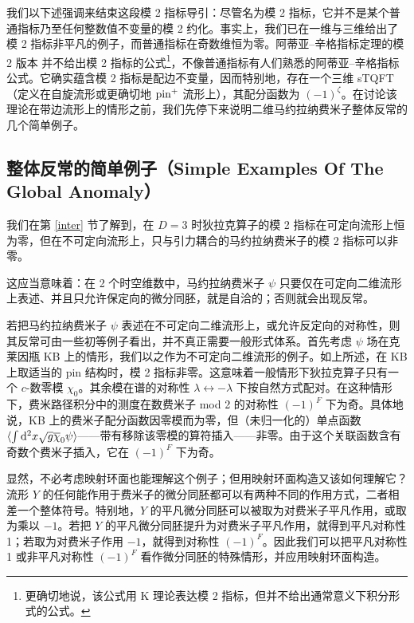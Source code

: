 我们以下述强调来结束这段模 2 指标导引：尽管名为模 2 指标，它并不是某个普通指标乃至任何整数值不变量的模 2 约化。事实上，我们已在一维与三维给出了模 2 指标非平凡的例子，而普通指标在奇数维恒为零。阿蒂亚--辛格指标定理的模 2 版本 \cite{AStwo} 并不给出模 2 指标的公式\footnote{更确切地说，该公式用 K 理论表达模 2 指标，但并不给出通常意义下积分形式的公式。}，不像普通指标有人们熟悉的阿蒂亚--辛格指标公式。它确实蕴含模 2 指标是配边不变量，因而特别地，存在一个三维 sTQFT（定义在自旋流形或更确切地 ${\mathrm{pin}}^+$ 流形上），其配分函数为 $(-1)^\zeta$。在讨论该理论在带边流形上的情形之前，我们先停下来说明二维马约拉纳费米子整体反常的几个简单例子。


\subsection{整体反常的简单例子（Simple Examples Of The Global Anomaly）}\label{simpex}

我们在第 \ref{inter} 节了解到，在 $D=3$ 时狄拉克算子的模 2 指标在可定向流形上恒为零，但在不可定向流形上，只与引力耦合的马约拉纳费米子的模 2 指标可以非零。

这应当意味着：在 2 个时空维数中，马约拉纳费米子 $\psi$ 只要仅在可定向二维流形上表述、并且只允许保定向的微分同胚，就是自洽的；否则就会出现反常。

若把马约拉纳费米子 $\psi$ 表述在不可定向二维流形上，或允许反定向的对称性，则其反常可由一些初等例子看出，并不真正需要一般形式体系。首先考虑 $\psi$ 场在克莱因瓶 KB 上的情形，我们以之作为不可定向二维流形的例子。如上所述，在 KB 上取适当的 pin 结构时，模 2 指标非零。这意味着一般情形下狄拉克算子只有一个 $c$-数零模 $\chi_0$。其余模在谱的对称性 $\lambda\leftrightarrow-\lambda$ 下按自然方式配对。在这种情形下，费米路径积分中的测度在数费米子 mod 2 的对称性 $(-1)^F$ 下为奇。具体地说，KB 上的费米子配分函数因零模而为零，但（未归一化的）单点函数 $\langle \int{\mathrm d}^2x\sqrt g\overline\chi_0\psi\rangle$------带有移除该零模的算符插入------非零。由于这个关联函数含有奇数个费米子插入，它在 $(-1)^F$ 下为奇。

显然，不必考虑映射环面也能理解这个例子；但用映射环面构造又该如何理解它？流形 $Y$ 的任何能作用于费米子的微分同胚都可以有两种不同的作用方式，二者相差一个整体符号。特别地，$Y$ 的平凡微分同胚可以被取为对费米子平凡作用，或取为乘以 $-1$。若把 $Y$ 的平凡微分同胚提升为对费米子平凡作用，就得到平凡对称性 1；若取为对费米子作用 $-1$，就得到对称性 $(-1)^F$。因此我们可以把平凡对称性 1 或非平凡对称性 $(-1)^F$ 看作微分同胚的特殊情形，并应用映射环面构造。

